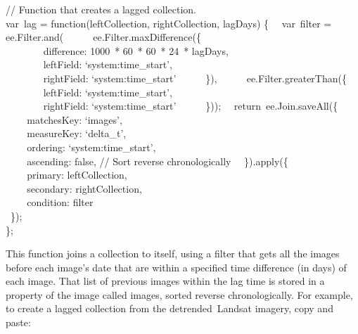 \documentclass[
  letterpaper,
  DIV=11,
  numbers=noendperiod]{scrreprt}
\begin{document}
// Function that creates a lagged collection.\\
var~lag = function(leftCollection, rightCollection, lagDays) \{~
~var~filter = ee.Filter.and(~ ~ ~ ~ee.Filter.maxDifference(\{\\
\hspace*{0.333em} ~ ~ ~ ~ ~difference: 1000~* 60~* 60~* 24~* lagDays,\\
\hspace*{0.333em} ~ ~ ~ ~ ~leftField: `system:time\_start',\\
\hspace*{0.333em} ~ ~ ~ ~ ~rightField: `system:time\_start'~ ~ ~ ~\}),~
~ ~ ~ee.Filter.greaterThan(\{\\
\hspace*{0.333em} ~ ~ ~ ~ ~leftField: `system:time\_start',\\
\hspace*{0.333em} ~ ~ ~ ~ ~rightField: `system:time\_start'~ ~ ~ ~\}));~
~return~ee.Join.saveAll(\{\\
\hspace*{0.333em} ~ ~ ~matchesKey: `images',\\
\hspace*{0.333em} ~ ~ ~measureKey: `delta\_t',\\
\hspace*{0.333em} ~ ~ ~ordering: `system:time\_start',\\
\hspace*{0.333em} ~ ~ ~ascending: false, // Sort reverse
chronologically~ ~\}).apply(\{\\
\hspace*{0.333em} ~ ~ ~primary: leftCollection,\\
\hspace*{0.333em} ~ ~ ~secondary: rightCollection,\\
\hspace*{0.333em} ~ ~ ~condition: filter\\
\hspace*{0.333em} ~\});\\
\};

This function joins a collection to itself, using a filter that gets all
the images before each image's date that are within a specified time
difference (in days) of each image. That list of previous images within
the lag time is stored in a property of the image called images, sorted
reverse chronologically. For example, to create a lagged collection from
the detrended~Landsat imagery, copy and paste:
\end{document}
